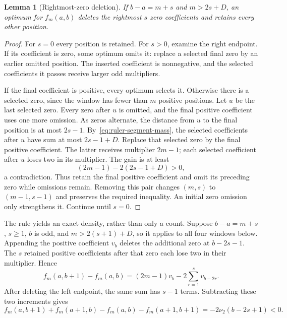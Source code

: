 \documentclass[11pt]{article}
\newtheorem{lemma}[theorem]{Lemma}
\begin{document}
\begin{lemma}[Rightmost-zero deletion]\label{lem:rightmost-zero}
If $b-a=m+s$ and $m>2s+D$, an optimum for $f_m(a,b)$ deletes the
rightmost $s$ zero coefficients and retains every other position.
\end{lemma}
\begin{proof}
For $s=0$ every position is retained. For $s>0$, examine the right endpoint.
If its coefficient is zero, some optimum omits it: replace a selected final
zero by an earlier omitted position. The inserted coefficient is nonnegative,
and the selected coefficients it passes receive larger odd multipliers.

If the final coefficient is positive, every optimum selects it. Otherwise
there is a selected zero, since the window has fewer than $m$ positive
positions. Let $u$ be the last selected zero. Every zero after $u$ is
omitted, and the final positive coefficient uses one more omission. As
zeros alternate, the distance from $u$ to the final position is at most
$2s-1$. By~\eqref{eq:ruler-segment-mass}, the selected coefficients after
$u$ have sum at most $2s-1+D$. Replace that selected zero by the final
positive coefficient. The latter receives multiplier $2m-1$; each selected
coefficient after $u$ loses two in its multiplier. The gain is at least
\[
 (2m-1)-2(2s-1+D)>0,
\]
a contradiction. Thus retain the final positive coefficient and omit its
preceding zero while omissions remain. Removing this pair changes $(m,s)$
to $(m-1,s-1)$ and preserves the required inequality. An initial zero
omission only strengthens it. Continue until $s=0$.
\end{proof}

The rule yields an exact density, rather than only a count. Suppose
$b-a=m+s$, $s\ge1$, $b$ is odd, and $m>2(s+1)+D$, so it applies to all
four windows below. Appending the positive coefficient $v_b$ deletes the
additional zero at $b-2s-1$. The $s$ retained positive coefficients after
that zero each lose two in their multiplier. Hence
\[
 f_m(a,b+1)-f_m(a,b)
  =(2m-1)v_b-2\sum_{r=1}^s v_{b-2r}.
\]
After deleting the left endpoint, the same sum has $s-1$ terms. Subtracting
these two increments gives
\begin{equation}\label{eq:ramp-score-density}
 f_m(a,b+1)+f_m(a+1,b)-f_m(a,b)-f_m(a+1,b+1)
       =-2\nu_2(b-2s+1)<0.
\end{equation}
\end{document}
